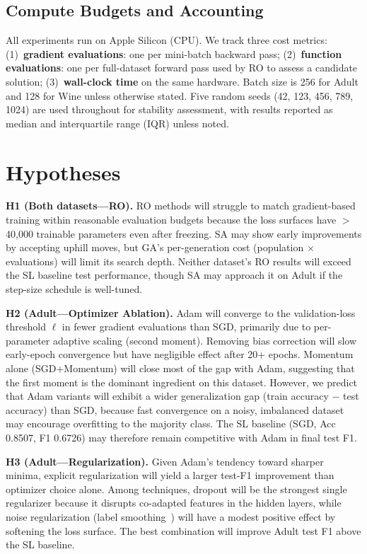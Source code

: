 \documentclass[10 pt, twocolumn]{article}
\begin{document}
\subsection{Compute Budgets and Accounting}

All experiments run on Apple Silicon (CPU). We track three cost metrics: (1)~\textbf{gradient evaluations}: one per mini-batch backward pass; (2)~\textbf{function evaluations}: one per full-dataset forward pass used by RO to assess a candidate solution; (3)~\textbf{wall-clock time} on the same hardware. Batch size is 256 for Adult and 128 for Wine unless otherwise stated. Five random seeds (42, 123, 456, 789, 1024) are used throughout for stability assessment, with results reported as median and interquartile range (IQR) unless noted.

\section{Hypotheses}

\textbf{H1 (Both datasets---RO).} RO methods will struggle to match gradient-based training within reasonable evaluation budgets because the loss surfaces have $>$40{,}000 trainable parameters even after freezing. SA may show early improvements by accepting uphill moves, but GA's per-generation cost (population $\times$ evaluations) will limit its search depth. Neither dataset's RO results will exceed the SL baseline test performance, though SA may approach it on Adult if the step-size schedule is well-tuned.

\textbf{H2 (Adult---Optimizer Ablation).} Adam will converge to the validation-loss threshold $\ell$ in fewer gradient evaluations than SGD, primarily due to per-parameter adaptive scaling (second moment). Removing bias correction will slow early-epoch convergence but have negligible effect after 20+ epochs. Momentum alone (SGD+Momentum) will close most of the gap with Adam, suggesting that the first moment is the dominant ingredient on this dataset. However, we predict that Adam variants will exhibit a wider generalization gap (train accuracy $-$ test accuracy) than SGD, because fast convergence on a noisy, imbalanced dataset may encourage overfitting to the majority class. The SL baseline (SGD, Acc 0.8507, F1 0.6726) may therefore remain competitive with Adam in final test F1.

\textbf{H3 (Adult---Regularization).} Given Adam's tendency toward sharper minima, explicit regularization will yield a larger test-F1 improvement than optimizer choice alone. Among techniques, dropout will be the strongest single regularizer because it disrupts co-adapted features in the hidden layers, while noise regularization (label smoothing~\cite{muller2019trivializing}) will have a modest positive effect by softening the loss surface. The best combination will improve Adult test F1 above the SL baseline.
\end{document}
